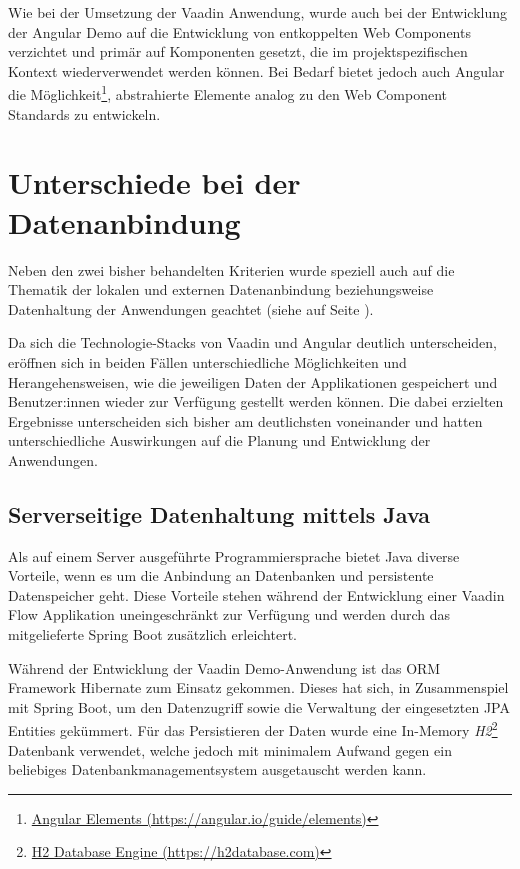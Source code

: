 \documentclass[a4paper,12pt,twoside]{scrreprt}
\begin{document}
Wie bei der Umsetzung der Vaadin Anwendung, wurde auch bei der Entwicklung der Angular Demo auf die Entwicklung von entkoppelten Web Components verzichtet und primär auf Komponenten gesetzt, die im projektspezifischen Kontext wiederverwendet werden können. Bei Bedarf bietet jedoch auch Angular die Möglichkeit\footnote{\href{https://angular.io/guide/elements/}{Angular Elements (https://angular.io/guide/elements)}}, abstrahierte Elemente analog zu den Web Component Standards zu entwickeln.

\section{Unterschiede bei der Datenanbindung}
\label{sec:results-datenanbindung}
Neben den zwei bisher behandelten Kriterien wurde speziell auch auf die Thematik der lokalen und externen Datenanbindung beziehungsweise Datenhaltung der Anwendungen geachtet (siehe \textit{} auf Seite \pageref{sub-sec:kriterien-datenanbindung}).

Da sich die Technologie-Stacks von Vaadin und Angular deutlich unterscheiden, eröffnen sich in beiden Fällen unterschiedliche Möglichkeiten und Herangehensweisen, wie die jeweiligen Daten der Applikationen gespeichert und Benutzer:innen wieder zur Verfügung gestellt werden können. Die dabei erzielten Ergebnisse unterscheiden sich bisher am deutlichsten voneinander und hatten unterschiedliche Auswirkungen auf die Planung und Entwicklung der Anwendungen.

\subsection{Serverseitige Datenhaltung mittels Java}
\label{sub-sec:result-datenanbindung-vaadin}
Als auf einem Server ausgeführte Programmiersprache bietet Java diverse Vorteile, wenn es um die Anbindung an Datenbanken und persistente Datenspeicher geht. Diese Vorteile stehen während der Entwicklung einer Vaadin Flow Applikation uneingeschränkt zur Verfügung und werden durch das mitgelieferte Spring Boot zusätzlich erleichtert.

\medskip

Während der Entwicklung der Vaadin Demo-Anwendung ist das ORM Framework Hibernate zum Einsatz gekommen. Dieses hat sich, in Zusammenspiel mit Spring Boot, um den Datenzugriff sowie die Verwaltung der eingesetzten \ac{JPA} Entities gekümmert. Für das Persistieren der Daten wurde eine In-Memory \textit{H2}\footnote{\href{https://h2database.com/}{H2 Database Engine (https://h2database.com)}} Datenbank verwendet, welche jedoch mit minimalem Aufwand gegen ein beliebiges Datenbankmanagementsystem ausgetauscht werden kann.
\end{document}
